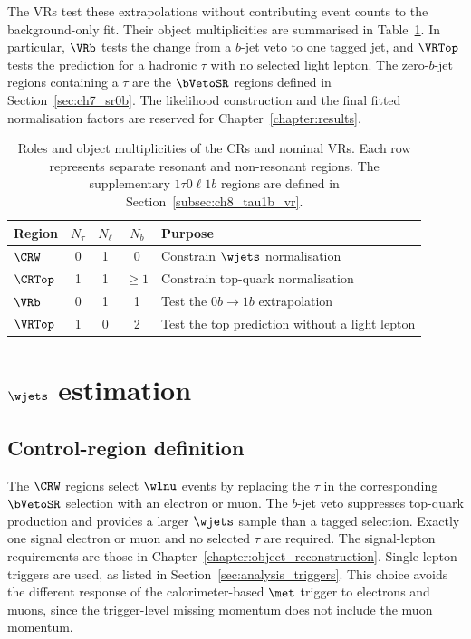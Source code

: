 The VRs test these extrapolations without contributing event counts to the background-only fit.
Their object multiplicities are summarised in Table~\ref{tab:ch8_region_roles}.
In particular, $\VRb$ tests the change from a $b$-jet veto to one tagged jet, and $\VRTop$ tests the prediction for a hadronic $\tau$ with no selected light lepton.
The zero-$b$-jet regions containing a $\tau$ are the $\bVetoSR$ regions defined in Section~\ref{sec:ch7_sr0b}.
The likelihood construction and the final fitted normalisation factors are reserved for Chapter~\ref{chapter:results}.

\begin{table}[htbp]
    \centering
    \small
    \caption{Roles and object multiplicities of the CRs and nominal VRs. Each row represents separate resonant and non-resonant regions. The supplementary $1\tau0\ell1b$ regions are defined in Section~\ref{subsec:ch8_tau1b_vr}.}
    \label{tab:ch8_region_roles}
    \begin{tabular}{lcccl}
        \toprule
        Region & $N_\tau$ & $N_\ell$ & $N_b$ & Purpose \\
        \midrule
        $\CRW$ & 0 & 1 & 0 & Constrain $\wjets$ normalisation \\
        $\CRTop$ & 1 & 1 & $\geq1$ & Constrain top-quark normalisation \\
        $\VRb$ & 0 & 1 & 1 & Test the $0b\to1b$ extrapolation \\
        $\VRTop$ & 1 & 0 & 2 & Test the top prediction without a light lepton \\
        \bottomrule
    \end{tabular}
\end{table}

\section[W+jets estimation]{$\wjets$ estimation}
\label{sec:ch8_wjets}

\subsection{Control-region definition}
\label{subsec:ch8_wcr_definition}

The $\CRW$ regions select $\wlnu$ events by replacing the $\tau$ in the corresponding $\bVetoSR$ selection with an electron or muon.
The $b$-jet veto suppresses top-quark production and provides a larger $\wjets$ sample than a tagged selection.
Exactly one signal electron or muon and no selected $\tau$ are required.
The signal-lepton requirements are those in Chapter~\ref{chapter:object_reconstruction}.
Single-lepton triggers are used, as listed in Section~\ref{sec:analysis_triggers}.
This choice avoids the different response of the calorimeter-based $\met$ trigger to electrons and muons, since the trigger-level missing momentum does not include the muon momentum.

